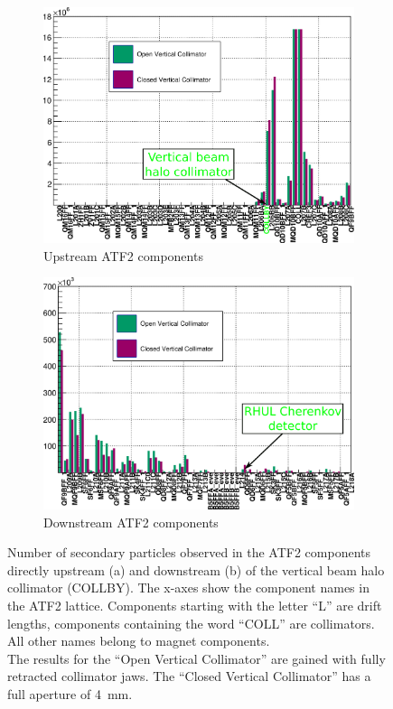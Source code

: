\begin{figure}
\centering
\begin{subfigure}[b]{0.49\textwidth}
 \centering
 \includegraphics[width=\textwidth]{Figures/ATF/TracksPerModel_firstPart.png}
 \caption{Upstream ATF2 components}
\end{subfigure}
\hfill
\begin{subfigure}[b]{0.49\textwidth}
  \centering
 \includegraphics[width=\textwidth]{Figures/ATF/TracksPerModel_secondPart.png}
 \caption{Downstream ATF2 components}
\end{subfigure}
\caption[Number of secondary particles created in the ATF2 components]{Number of secondary particles observed in the ATF2 components directly upstream (a) and downstream (b) of the vertical beam halo collimator (COLLBY).
The x-axes show the component names in the ATF2 lattice.
Components starting with the letter ``L'' are drift lengths, components containing the word ``COLL'' are collimators.
All other names belong to magnet components.
\\The results for the ``Open Vertical Collimator'' are gained with fully retracted collimator jaws.
The ``Closed Vertical Collimator'' has a full aperture of \SI[detect-all]{4}{\milli\meter}.
}
\label{fig:ParticlesPerModel}
\end{figure}

